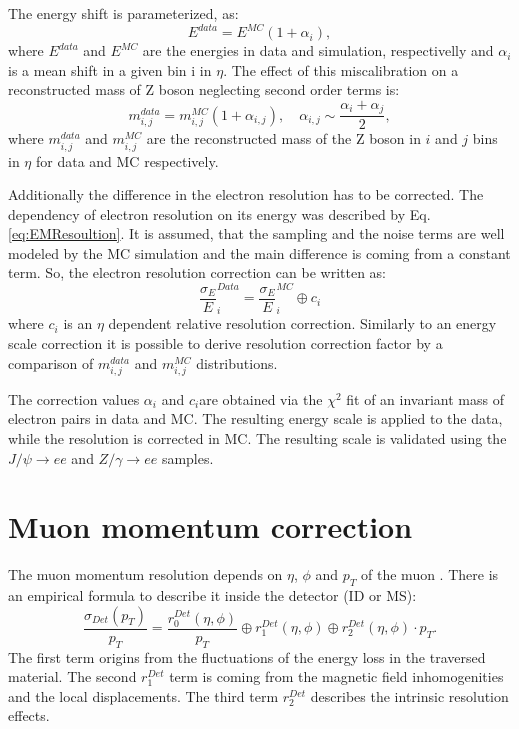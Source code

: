 The energy shift is parameterized, as:
\begin{equation}
E^{data}=E^{MC}(1+\alpha_i),
\end{equation}
where $E^{data}$ and $E^{MC}$ are the energies in data and simulation, respectivelly and $\alpha_i$ is a mean shift in a given bin i in $\eta$. The effect of this miscalibration on a reconstructed mass of Z boson neglecting second order terms is:
\begin{equation}
m_{i,j}^{data}=m_{i,j}^{MC}(1+\alpha_{i,j}), \quad \alpha_{i,j} \sim \frac{\alpha_i+\alpha_j}{2}, 
\end{equation}
where $m_{i,j}^{data}$ and $m_{i,j}^{MC}$ are the reconstructed mass of the Z boson in $i$ and $j$ bins in $\eta$ for data and MC respectively. 

Additionally the difference in the electron resolution has to be corrected. The dependency of electron resolution on its energy was described by Eq. \ref{eq:EMResoultion}. It is assumed, that the sampling and the noise terms are well modeled by the MC simulation and the main difference is coming from a constant term. 
So, the electron resolution correction can be written as:
\begin{equation}
\frac{\sigma_E}{E}^{Data}_{i}=\frac{\sigma_E}{E}^{MC}_{i} \oplus c_i
\end{equation}
where $c_i$ is an $\eta$ dependent relative resolution correction. Similarly to an energy scale correction it is possible to derive resolution correction factor by a comparison  of $m_{i,j}^{data}$ and $m_{i,j}^{MC}$ distributions. 

The correction values $\alpha_i$ and $c_i$are obtained via the $\chi^2$ fit of an invariant mass of electron pairs in data and MC. The resulting energy scale is applied to the data, while the resolution is corrected in MC. The resulting scale is validated using the $J/\psi \to ee$ and $Z/\gamma \to ee $ samples.

\section{Muon momentum correction}\label{sec:MuonMomCor}
The muon momentum resolution depends on $\eta$, $\phi$ and $p_T$ of the muon \cite{AtlasExperiment}. There is an empirical formula to describe it inside the detector (ID or MS)\cite{MuonCalib}:
\begin{equation}\label{eq:MuonResolution}
\frac{\sigma_{Det}(p_T)}{p_T}=\frac{r^{Det}_0(\eta, \phi)}{p_T} \oplus r^{Det}_1 (\eta, \phi)  \oplus r^{Det}_2(\eta, \phi) \cdot p_T.
\end{equation}
The first term origins from the fluctuations of the energy loss in the traversed material. The second $r^{Det}_1$ term is coming from the magnetic field inhomogenities and the local displacements. The third term $r^{Det}_2$ describes the intrinsic resolution effects. 


